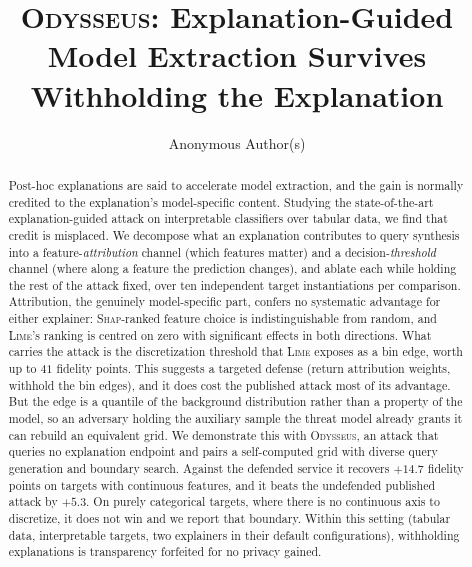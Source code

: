 \documentclass[sigconf,anonymous,review]{acmart}
\newcommand{\sys}{\textsc{Odysseus}}
\begin{document}
\title[\sys]{\sys: Explanation-Guided Model Extraction
Survives Withholding the Explanation}

\author{Anonymous Author(s)}
\email{}
\renewcommand{\shortauthors}{Anonymous}

\begin{abstract}
Post-hoc explanations are said to accelerate model extraction, and the gain is normally credited to
the explanation's model-specific content. Studying the state-of-the-art explanation-guided attack on
interpretable classifiers over tabular data, we find that credit is misplaced. We decompose what an
explanation contributes to query synthesis into a feature-\emph{attribution} channel (which features
matter) and a decision-\emph{threshold} channel (where along a feature the prediction changes), and
ablate each while holding the rest of the attack fixed, over ten independent target instantiations per
comparison. Attribution, the genuinely model-specific part, confers no systematic advantage for
either explainer: \textsc{Shap}-ranked feature choice is indistinguishable from random, and
\textsc{Lime}'s ranking is centred on zero with significant effects in both directions. What carries
the attack is the discretization threshold that \textsc{Lime} exposes as a bin edge, worth up to $41$
fidelity points. This suggests a targeted defense (return attribution weights, withhold the bin edges), and it does cost the published attack most of its advantage. But the edge is a quantile of the
background distribution rather than a property of the model, so an adversary holding the auxiliary
sample the threat model already grants it can rebuild an equivalent grid. We demonstrate this with
\sys, an attack that queries no explanation endpoint and pairs a self-computed grid with diverse query
generation and boundary search. Against the defended service it recovers $+14.7$ fidelity points on
targets with continuous features, and it beats the undefended published attack by $+5.3$. On purely categorical targets, where there is no continuous axis to discretize, it does not win and we report
that boundary. Within this setting (tabular data, interpretable targets, two explainers in their default configurations), withholding explanations is transparency forfeited for no privacy gained.
\end{abstract}

\end{document}

